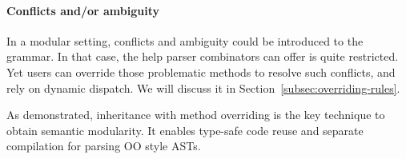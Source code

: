 \vspace{-.05in}
\paragraph{Conflicts and/or ambiguity} In a modular setting, conflicts and
ambiguity could be introduced to the grammar. In that case, the help parser combinators
can offer is quite restricted. Yet users can override those problematic methods to resolve
such conflicts, and rely on dynamic dispatch. We will discuss it in Section~\ref{subsec:overriding-rules}.

As demonstrated, inheritance with method overriding is the key
technique to obtain semantic modularity.  It enables type-safe code
reuse and separate compilation for parsing OO style ASTs.
